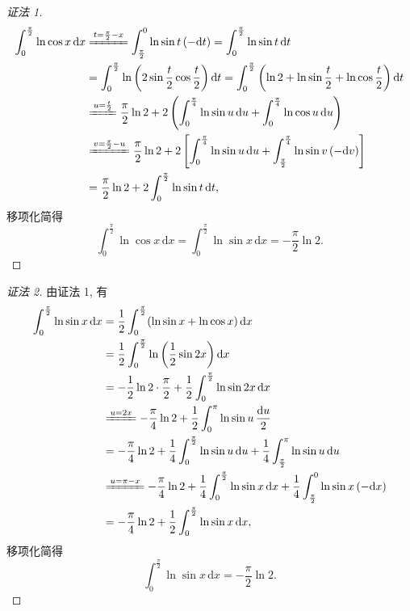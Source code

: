 \begin{proof}[证法 1]
\begin{align*}
\int_{0}^{\frac{\pi}{2}}\ln\cos x\,\mathrm{d}x&\xlongequal{t=\frac{\pi}{2}-x}\int_{\frac{\pi}{2}}^{0}\ln\sin t\,(-\mathrm{d}t)=\int_{0}^{\frac{\pi}{2}}\ln\sin t\,\mathrm{d}t\\
&=\int_{0}^{\frac{\pi}{2}}\ln\left(2\sin\frac{t}{2}\cos\frac{t}{2}\right)\mathrm{d}t=\int_{0}^{\frac{\pi}{2}}\left(\ln2+\ln\sin\frac{t}{2}+\ln\cos\frac{t}{2}\right)\mathrm{d}t\\
&\xlongequal{u=\frac{t}{2}}\frac{\pi}{2}\ln2+2\left(\int_{0}^{\frac{\pi}{4}}\ln\sin u\,\mathrm{d}u+\int_{0}^{\frac{\pi}{4}}\ln\cos u\,\mathrm{d}u\right)\\
&\xlongequal{v=\frac{\pi}{2}-u}\frac{\pi}{2}\ln2+2\left[\int_{0}^{\frac{\pi}{4}}\ln\sin u\,\mathrm{d}u+\int_{\frac{\pi}{2}}^{\frac{\pi}{4}}\ln\sin v\,(-\mathrm{d}v)\right]\\
&=\frac{\pi}{2}\ln2+2\int_{0}^{\frac{\pi}{2}}\ln\sin t\,\mathrm{d}t,
\end{align*}
移项化简得
\[
\int_{0}^{\frac{\pi}{2}}\ln\cos x\,\mathrm{d}x=\int_{0}^{\frac{\pi}{2}}\ln\sin x\,\mathrm{d}x=-\frac{\pi}{2}\ln2.
\]
\end{proof}

\begin{proof}[证法 2]
由证法 1, 有
\begin{align*}
\int_{0}^{\frac{\pi}{2}}\ln\sin x\,\mathrm{d}x&=\frac{1}{2}\int_{0}^{\frac{\pi}{2}}(\ln\sin x+\ln\cos x)\,\mathrm{d}x\\
&=\frac{1}{2}\int_{0}^{\frac{\pi}{2}}\ln\left(\frac{1}{2}\sin2x\right)\mathrm{d}x\\
&=-\frac{1}{2}\ln2\cdot\frac{\pi}{2}+\frac{1}{2}\int_{0}^{\frac{\pi}{2}}\ln\sin2x\,\mathrm{d}x\\
&\xlongequal{u=2x}-\frac{\pi}{4}\ln2+\frac{1}{2}\int_{0}^{\pi}\ln\sin u\,\frac{\mathrm{d}u}{2}\\
&=-\frac{\pi}{4}\ln2+\frac{1}{4}\int_{0}^{\frac{\pi}{2}}\ln\sin u\,\mathrm{d}u+\frac{1}{4}\int_{\frac{\pi}{2}}^{\pi}\ln\sin u\,\mathrm{d}u\\
&\xlongequal{u=\pi-x}-\frac{\pi}{4}\ln2+\frac{1}{4}\int_{0}^{\frac{\pi}{2}}\ln\sin x\,\mathrm{d}x+\frac{1}{4}\int_{\frac{\pi}{2}}^{0}\ln\sin x\,(-\mathrm{d}x)\\
&=-\frac{\pi}{4}\ln2+\frac{1}{2}\int_{0}^{\frac{\pi}{2}}\ln\sin x\,\mathrm{d}x,
\end{align*}
移项化简得
\[
\int_{0}^{\frac{\pi}{2}}\ln\sin x\,\mathrm{d}x=-\frac{\pi}{2}\ln2.
\]
\end{proof}

